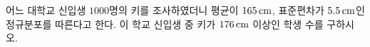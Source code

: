 어느 대학교 신입생 $1000$명의 키를 조사하였더니 평균이 $165\mkern3mu \mathrm{cm}$, 표준편차가 $5.5\mkern3mu \mathrm{cm}$인 정규분포를 따른다고 한다. 이 학교 신입생 중 키가 $176\mkern3mu \mathrm{cm}$ 이상인 학생 수를 구하시오. 
